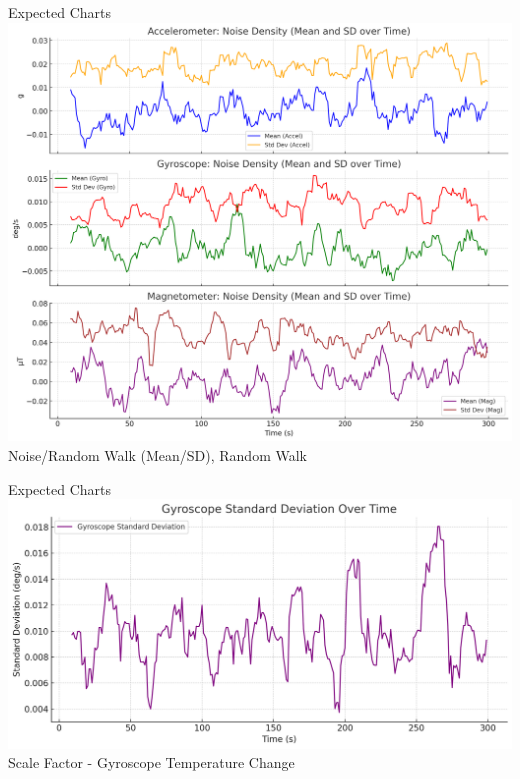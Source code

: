 \documentclass{beamer}
\begin{document}
\begin{frame}{Expected Charts}
    \centering 
    \includegraphics[width=1.0\textwidth, height=0.8\textheight, keepaspectratio]{images/imu-noise.png}
    \vspace{0.5em} 
    Noise/Random Walk (Mean/SD), Random Walk
\end{frame}

\begin{frame}{Expected Charts}
    \includegraphics[width=1.0\textwidth, height=0.8\textheight, keepaspectratio]{images/gyroscope-chart.png}
    \vspace{0.5em} 
    Scale Factor - Gyroscope Temperature Change
\end{frame}
\end{document}
